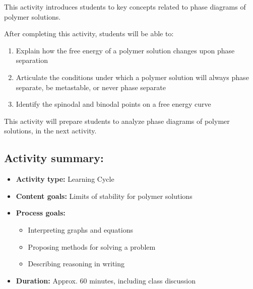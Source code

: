 %
%
%
%

\renewcommand{\figpath}{content/polymphys/solution-thermo/phase-sep/figs}
\renewcommand{\labelbase}{phase-sep}

\begin{activity}

\begin{instructornotes}

	This activity introduces students to key concepts related to phase diagrams of polymer solutions.
	
	After completing this activity, students will be able to:
			\begin{enumerate}
				\item Explain how the free energy of a polymer solution changes upon phase separation
				\item Articulate the conditions under which a polymer solution will always phase separate, be metastable, or never phase separate
				\item Identify the spinodal and binodal points on a free energy curve
			\end{enumerate}
			
	This activity will prepare students to analyze phase diagrams of polymer solutions, in the next activity.
			
	\subsection*{Activity summary:}
	\begin{itemize}
		\item \textbf{Activity type:} Learning Cycle
		\item \textbf{Content goals:} Limits of stability for polymer solutions
		\item \textbf{Process goals:} %
			\begin{itemize}
				\item Interpreting graphs and equations
				\item Proposing methods for solving a problem
				\item Describing reasoning in writing
			\end{itemize}
		\item \textbf{Duration:} Approx. 60 minutes, including class discussion
		

\end{itemize}
\end{instructornotes}
\end{activity}
